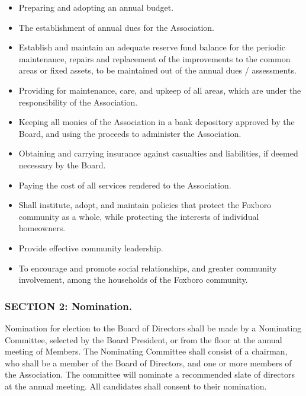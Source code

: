 \begin{itemize}
\item Preparing and adopting an annual budget.

\item The establishment of annual dues for the Association.

\item Establish and maintain an adequate reserve fund balance for the
periodic maintenance, repairs and replacement of the improvements to
the common areas or fixed assets, to be maintained out of the annual
dues / assessments.

\item Providing for maintenance, care, and upkeep of all areas, which
are under the responsibility of the Association.

\item Keeping all monies of the Association in a bank depository approved
by the Board, and using the proceeds to administer the Association.

\item Obtaining and carrying insurance against casualties and liabilities,
if deemed necessary by the Board.

\item Paying the cost of all services rendered to the Association.

\item Shall institute, adopt, and maintain policies that protect
the Foxboro community as a whole, while protecting the interests of
individual homeowners.

\item Provide effective community leadership.

\item To encourage and promote social relationships, and greater community
involvement, among the households of the Foxboro community.

\end{itemize}


\subsubsection{SECTION 2: Nomination.}
Nomination for election to the Board of Directors shall be made by
a Nominating Committee, selected by the Board President, or from the
floor at the annual meeting of Members. The Nominating Committee shall
consist of a chairman, who shall be a member of the Board of Directors,
and one or more members of the Association. The committee will nominate
a recommended slate of directors at the annual meeting. All candidates
shall consent to their nomination.

